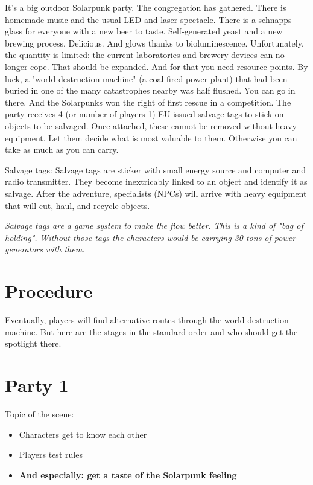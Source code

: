It's a big outdoor Solarpunk party. The congregation has gathered. There is homemade music and the usual LED and laser spectacle. There is a schnapps glass for everyone with a new beer to taste.
Self-generated yeast and a new brewing process. Delicious. And glows thanks to bioluminescence. Unfortunately, the quantity is limited: the current laboratories and brewery devices can no longer cope. That should be expanded. And for that you need resource points.
By luck, a "world destruction machine" (a coal-fired power plant) that had been buried in one of the many catastrophes nearby was half flushed. You can go in there. And the Solarpunks won the right of first rescue in a competition.
The party receives 4 (or number of players-1) EU-issued salvage tags to stick on objects to be salvaged. Once attached, these cannot be removed without heavy equipment. Let them decide what is most valuable to them. Otherwise you can take as much as you can carry.

Salvage tags:
Salvage tags are sticker with small energy source and computer and radio transmitter. They become inextricably linked to an object and identify it as salvage. After the adventure, specialists (NPCs) will arrive with heavy equipment that will cut, haul, and recycle objects.

\emph{Salvage tags are a game system to make the flow better. This is a kind of "bag of holding". Without those tags the characters would be carrying 30 tons of power generators with them.}

\section{Procedure}
Eventually, players will find alternative routes through the world destruction machine. But here are the stages in the
standard order and who should get the spotlight there.



\section{Party 1}
Topic of the scene: 
\begin{itemize}
\item Characters get to know each other
\item Players test rules
\item \bf{And especially: get a taste of the Solarpunk feeling}
\end{itemize}

